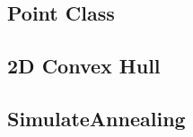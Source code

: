 \documentclass[a4paper,10pt,twocolumn,oneside]{article}
\begin{document}
%

%

\subsection{Point Class}


\subsection{2D Convex Hull}


\subsection{SimulateAnnealing}


%

%

%

%
\end{document}
